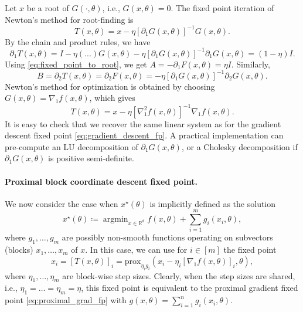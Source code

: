 \documentclass{article}
\def\RR{{\mathbb R}}
\def\prox{{\text{prox}}}
\DeclareMathOperator*{\argmin}{argmin}
\begin{document}
Let $x$ be a root of $G(\cdot, \theta)$, i.e., $G(x, \theta) = 0$.
The fixed point iteration of Newton's method for root-finding is
\begin{equation}
T(x, \theta) = x - \eta [\partial_1 G(x, \theta)]^{-1} G(x, \theta).
\end{equation}
By the chain and product rules, we have
\begin{equation}
\partial_1 T(x, \theta) = I 
- \eta (...) G(x, \theta) 
- \eta [\partial_1 G(x, \theta)]^{-1} \partial_1 G(x, \theta)
= (1 - \eta) I.
\end{equation}
Using \eqref{eq:fixed_point_to_root}, we get
$A = -\partial_1 F(x, \theta) = \eta I$.
Similarly,
\begin{equation}
B = \partial_2 T(x, \theta) = \partial_2 F(x, \theta) = 
- \eta [\partial_1 G(x, \theta)]^{-1} \partial_2 G(x, \theta).
\end{equation}
Newton's method for optimization is obtained by choosing 
$G(x, \theta) = \nabla_1 f(x, \theta)$,
which gives
\begin{equation}
T(x, \theta) = x - \eta [\nabla_1^2 f(x, \theta)]^{-1} \nabla_1 f(x, \theta).
\label{eq:newton_opt_fp}
\end{equation}
It is easy to check that we
recover the same linear system as for the gradient descent fixed point
\eqref{eq:gradient_descent_fp}.
A practical implementation can pre-compute an LU decomposition of $\partial_1
G(x, \theta)$, or a Cholesky decomposition if $\partial_1 G(x, \theta)$
is positive semi-definite.

\paragraph{Proximal block coordinate descent fixed point.}

We now consider the case when $x^\star(\theta)$ is implicitly defined as the
solution
\begin{equation}
x^\star(\theta) \coloneqq \argmin_{x \in \RR^d} f(x, \theta) + 
\sum_{i=1}^m g_i(x_i, \theta),
\end{equation}
where $g_1, \dots, g_m$ are possibly non-smooth functions operating on
subvectors (blocks) $x_1, \dots, x_m$ of $x$. In this case, we can use for $i
\in [m]$ the fixed point
\begin{equation}
x_i = [T(x, \theta)]_i = 
\prox_{\eta_i g_i}(x_i - \eta_i [\nabla_1 f(x, \theta)]_i, \theta),
\label{eq:bcd_fp}
\end{equation}
where $\eta_1, \dots, \eta_m$ are block-wise step sizes. Clearly, when the step
sizes are shared, i.e., $\eta_1 = \dots = \eta_m = \eta$, this fixed point is
equivalent to the proximal gradient fixed point \eqref{eq:proximal_grad_fp}
with $g(x, \theta) = \sum_{i=1}^n g_i(x_i, \theta)$.
\end{document}
